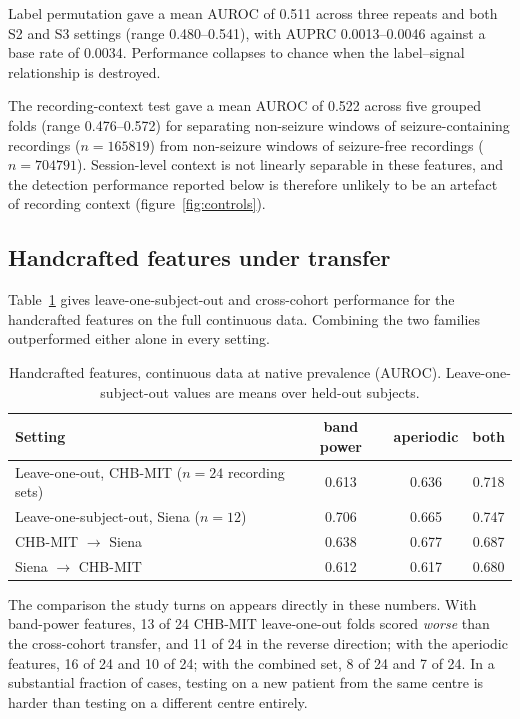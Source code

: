\documentclass[11pt,a4paper]{article}
\begin{document}
Label permutation gave a mean AUROC of 0.511 across three repeats and both S2
and S3 settings (range 0.480--0.541), with AUPRC 0.0013--0.0046 against a base
rate of 0.0034. Performance collapses to chance when the label--signal
relationship is destroyed.

The recording-context test gave a mean AUROC of 0.522 across five grouped
folds (range 0.476--0.572) for separating non-seizure windows of
seizure-containing recordings ($n=\num{165819}$) from non-seizure windows of
seizure-free recordings ($n=\num{704791}$). Session-level context is not
linearly separable in these features, and the detection performance reported
below is therefore unlikely to be an artefact of recording context
(figure~\ref{fig:controls}).

\subsection{Handcrafted features under transfer}\label{sec:hand}

Table~\ref{tab:linear} gives leave-one-subject-out and cross-cohort
performance for the handcrafted features on the full continuous data.
Combining the two families outperformed either alone in every setting.

\begin{table}[t]
\centering\small
\caption{Handcrafted features, continuous data at native prevalence (AUROC).
Leave-one-subject-out values are means over held-out subjects.}
\label{tab:linear}
\begin{tabular}{lccc}
\toprule
Setting & band power & aperiodic & both \\
\midrule
Leave-one-out, CHB-MIT ($n=24$ recording sets) & 0.613 & 0.636 & 0.718 \\
Leave-one-subject-out, Siena ($n=12$)   & 0.706 & 0.665 & 0.747 \\
CHB-MIT $\rightarrow$ Siena             & 0.638 & 0.677 & 0.687 \\
Siena $\rightarrow$ CHB-MIT             & 0.612 & 0.617 & 0.680 \\
\bottomrule
\end{tabular}
\end{table}

The comparison the study turns on appears directly in these numbers. With
band-power features, 13 of 24 CHB-MIT leave-one-out folds scored
\emph{worse} than the cross-cohort transfer, and 11 of 24 in the reverse
direction; with the aperiodic features, 16 of 24 and 10 of 24; with the
combined set, 8 of 24 and 7 of 24. In a substantial fraction of cases, testing
on a new patient from the same centre is harder than testing on a different
centre entirely.
\end{document}
